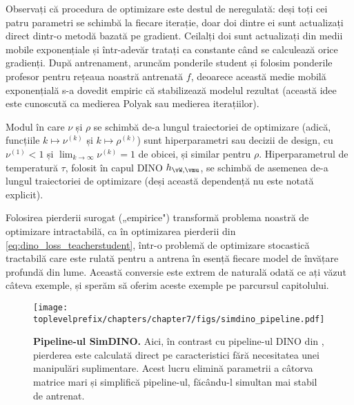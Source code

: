 \documentclass[../../book-main_ro.tex]{subfiles}
\begin{document}
Observați că procedura de optimizare este destul de neregulată: deși toți cei patru parametri se schimbă la fiecare iterație, doar doi dintre ei sunt actualizați direct dintr-o metodă bazată pe gradient. Ceilalți doi sunt actualizați din medii mobile exponențiale și într-adevăr tratați ca constante când se calculează orice gradienți. După antrenament, aruncăm ponderile student și folosim ponderile profesor pentru rețeaua noastră antrenată \(f\), deoarece această medie mobilă exponențială s-a dovedit empiric că stabilizează modelul rezultat (această idee este cunoscută ca medierea Polyak sau medierea iterațiilor).

Modul în care \(\nu\) și \(\rho\) se schimbă de-a lungul traiectoriei de optimizare (adică, funcțiile \(k \mapsto \nu^{(k)}\) și \(k \mapsto \rho^{(k)}\)) sunt hiperparametri sau decizii de design, cu \(\nu^{(1)} < 1\) și \(\lim_{k \to \infty}\nu^{(k)} = 1\) de obicei, și similar pentru \(\rho\). Hiperparametrul de temperatură \(\tau\), folosit în capul DINO \(h_{\vW, \vmu}\), se schimbă de asemenea de-a lungul traiectoriei de optimizare (deși această dependență nu este notată explicit).

Folosirea pierderii surogat („empirice") transformă problema noastră de optimizare intractabilă, ca în optimizarea pierderii din \eqref{eq:dino_loss_teacherstudent}, într-o problemă de optimizare stocastică tractabilă care este rulată pentru a antrena în esență fiecare model de învățare profundă din lume. Această conversie este extrem de naturală odată ce ați văzut câteva exemple, și sperăm să oferim aceste exemple pe parcursul capitolului.

\begin{figure}
    \centering 
    \texttt{[image: \\toplevelprefix/chapters/chapter7/figs/simdino\_pipeline.pdf]}
    \caption{\small\textbf{Pipeline-ul SimDINO.} Aici, în contrast cu pipeline-ul DINO din , pierderea este calculată direct pe caracteristici fără necesitatea unei manipulări suplimentare. Acest lucru elimină parametrii a câtorva matrice mari și simplifică pipeline-ul, făcându-l simultan mai stabil de antrenat.}\label{fig:simdino_pipeline}
\end{figure}
\end{document}
